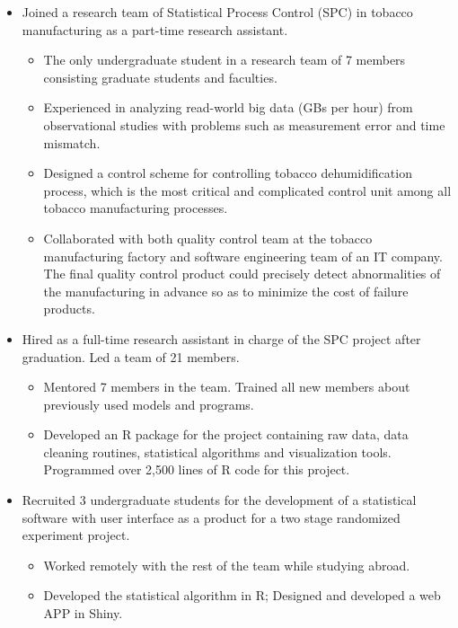 \documentclass[11pt]{article}
\begin{document}
\begin{itemize}
	\item Joined a research team of Statistical Process Control (SPC) in tobacco manufacturing as a part-time research assistant.
	\begin{itemize}
		\item The only undergraduate student in a research team of 7 members consisting graduate students and faculties.
		\item Experienced in analyzing read-world big data (GBs per hour) from observational studies with problems such as measurement error and time mismatch.
		\item Designed a control scheme for controlling tobacco dehumidification process, which is the most critical and complicated control unit among all tobacco manufacturing processes.
		\item Collaborated with both quality control team at the tobacco manufacturing factory and software engineering team of an IT company. The final quality control product could precisely detect abnormalities of the manufacturing in advance so as to minimize the cost of failure products.
	\end{itemize}

	\item Hired as a full-time research assistant in charge of the SPC project after graduation. Led a team of 21 members.
	\begin{itemize}
		\item Mentored 7 members in the team. Trained all new members about previously used models and programs.
		\item Developed an R package for the project containing raw data, data cleaning routines, statistical algorithms and visualization tools. Programmed over 2,500 lines of R code for this project.
	\end{itemize}

	\item Recruited 3 undergraduate students for the development of a statistical software with user interface as a product for a two stage randomized experiment project.
	\begin{itemize}
		\item Worked remotely with the rest of the team while studying abroad.
		\item Developed the statistical algorithm in R; Designed and developed a web APP in Shiny.
	\end{itemize}
\end{itemize}
\end{document}

